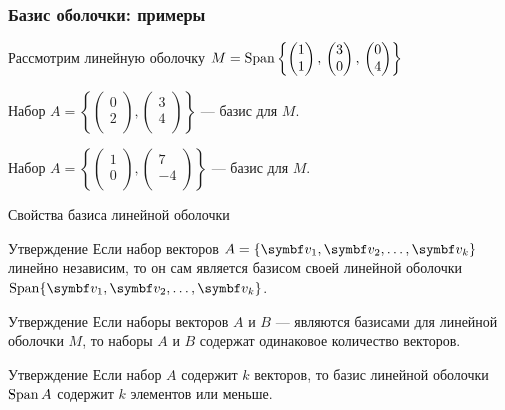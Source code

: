 \begin{frame}
\frametitle{Базис оболочки: примеры}

Рассмотрим линейную оболочку $M = \operatorname{Span}\left\{
\begin{pmatrix}
  1 \\
  1 \\
\end{pmatrix}, \, 
\begin{pmatrix}
  3 \\
  0 \\
\end{pmatrix},  \,
\begin{pmatrix}
  0 \\
  4 \\
\end{pmatrix}  
\right\}$

\pause

Набор $A = \left\{ \begin{pmatrix}
      0 \\
      2 \\
    \end{pmatrix}, \begin{pmatrix}
      3 \\
      4 \\
    \end{pmatrix} \right\}$ — базис для $M$.

\pause

Набор $A = \left\{ \begin{pmatrix}
  1 \\
  0 \\
\end{pmatrix}, \begin{pmatrix}
  7 \\
  -4 \\
\end{pmatrix} \right\}$ — базис для $M$.

\end{frame}




\begin{frame}{Свойства базиса линейной оболочки}

\begin{block}{Утверждение}
Если набор векторов $A =\{ \bv_1, \bv_2, \ldots, \bv_k\}$ линейно независим, то он сам
является базисом своей линейной оболочки $\Span  \{ \bv_1, \bv_2, \ldots, \bv_k\}$.
\end{block}


\pause
\begin{block}{Утверждение}
Если наборы векторов $A$ и $B$ — являются базисами для линейной оболочки $M$,
то наборы $A$ и $B$ содержат одинаковое количество векторов. 
\end{block}
  
\pause
\begin{block}{Утверждение}
Если набор $A$ содержит $k$ векторов, 
то базис линейной оболочки $\operatorname{Span} A$ содержит $k$ элементов или меньше. 
\end{block}
  


\end{frame}



